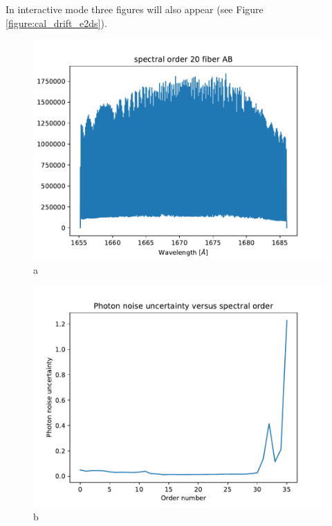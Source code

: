 \noindent In interactive mode three figures will also appear (see Figure \ref{figure:cal_drift_e2ds}).

\begin{figure}

\begin{center}
\begin{minipage}{.495\textwidth}
\begin{center}
\includegraphics[width=\textwidth]{Figures/cal_drift_e2ds_1.pdf}
a
\end{center}
\end{minipage}%
\begin{minipage}{.495\textwidth}
\begin{center}
\includegraphics[width=\textwidth]{Figures/cal_drift_e2ds_2.pdf}
b
\end{center}
\end{minipage}%
\end{center}


\end{figure}
